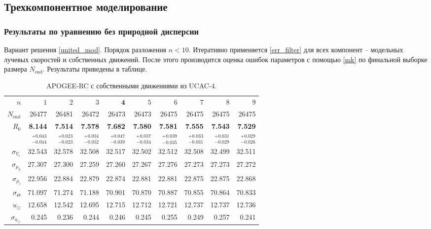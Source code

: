 \documentclass{matmex-diploma-custom}
\begin{document}
\pagebreak
\subsection{Трехкомпонентное моделирование}
\subsubsection{Результаты по уравнению без природной дисперсии}
Вариант решения \ref{united_mod}. Порядок разложения $n < 10$. Итеративно применяется \ref{err_filter} для всех компонент -- модельных лучевых скоростей и собственных движений. После этого производится оценка ошибок параметров с помощью \ref{mk} по финальной выборке размера $N_{\mathrm{end}}$. Результаты приведены в таблице. 
\begin{table}[h!!]
\centering
\caption{APOGEE-RC с собственными движениями из UCAC-4.}
\begin{tabular}{r|rr|rrr|rrrr}
\hline
$n$ & $1$ & $2$ & $3$ & $\textbf{4}$ & $5$&$ 6 $&$ 7 $&$ 8 $&$ 9 $\\
 $N_{\mathrm{end}}$ & 26477       &    26481 &    26472 &    26473 &    26473 &    26475 &    26475 &    26475 &    26475 \\
 $R_0 $&  \textbf{8.144}       &   \textbf{ 7.514} &    \textbf{7.578} &    \textbf{7.682} &  \textbf{   7.580} &  \textbf{  7.581} &  \textbf{  7.555} &  \textbf{  7.543} &  \textbf{  7.529} \\
       & $_{-0.044}^{+0.043} $ & $_{-0.023}^{+0.023}$ & $_{-0.032}^{+0.034}$   & $_{-0.039}^{+0.047}$  & $_{-0.034}^{+0.037}$  & $_{-0.035}^{+0.039}$  & $_{-0.031}^{+0.033}$  & $_{-0.029}^{+0.031}$  & $_{-0.026}^{+0.029}$  \\\hline
 $\sigma_{V_r} $& 32.543      &  32.578 &  32.508 &  32.517 &  32.502 &  32.512 &  32.508 &  32.499 &  32.511  \\ 
 $\sigma_{\mu_b} $& 27.307      &  27.300 &  27.259 &  27.260 &  27.267 &  27.276 &  27.273 &  27.273 &  27.272  \\ 
 $\sigma_{\mu_l} $& 22.956      &  22.884 &  22.879 &  22.874 &  22.881 &  22.881 &  22.875 &  22.875 &  22.868  \\\hline 
 $\sigma_{\Theta} $& 71.097      &  71.274 &  71.188 &  70.901 &  70.870 &  70.887 &  70.855 &  70.864 &  70.833  \\\hline 
 $ u_{\odot} $& 12.658      &   12.542 &   12.695 &   12.715 &   12.712 &   12.721 &   12.737 &   12.737 &   12.736 \\
 $\sigma_{u_{\odot}} $&0.245       &    0.236 &    0.244 &    0.246 &    0.245 &    0.255 &    0.249 &    0.257 &    0.241 \\

\end{tabular}
\end{table}
\end{document}
